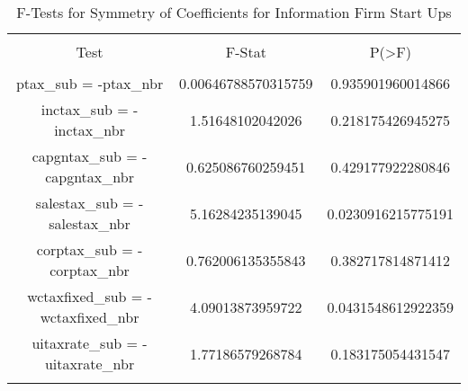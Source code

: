 
\begin{table}[!htbp] \centering 
  \caption{F-Tests for Symmetry of Coefficients for Information Firm Start Ups} 
  \label{} 
\begin{tabular}{@{\extracolsep{5pt}} ccc} 
\\[-1.8ex]\hline 
\hline \\[-1.8ex] 
Test & F-Stat & P(\textgreater F) \\ 
\hline \\[-1.8ex] 
ptax\_sub = -ptax\_nbr & 0.00646788570315759 & 0.935901960014866 \\ 
inctax\_sub = -inctax\_nbr & 1.51648102042026 & 0.218175426945275 \\ 
capgntax\_sub = -capgntax\_nbr & 0.625086760259451 & 0.429177922280846 \\ 
salestax\_sub = -salestax\_nbr & 5.16284235139045 & 0.0230916215775191 \\ 
corptax\_sub = -corptax\_nbr & 0.762006135355843 & 0.382717814871412 \\ 
wctaxfixed\_sub = -wctaxfixed\_nbr & 4.09013873959722 & 0.0431548612922359 \\ 
uitaxrate\_sub = -uitaxrate\_nbr & 1.77186579268784 & 0.183175054431547 \\ 
\hline \\[-1.8ex] 
\end{tabular} 
\end{table} 
